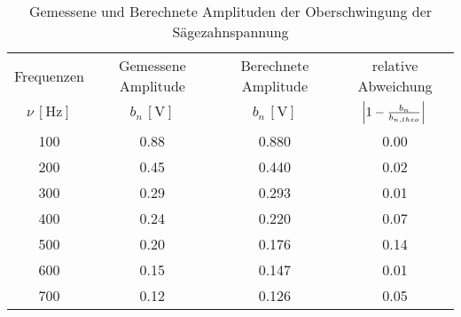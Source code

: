 \begin{table}[!h]
	\centering
	\begin{tabular}{|c|c|c|c|}
		\hline
		Frequenzen & Gemessene Amplitude & Berechnete Amplitude & relative Abweichung\\
		$\nu\,[\si{\hertz}]$ & $b_{n}\,[\si{\volt}]$ & $b_{n}\,[\si{\volt}]$ & $\envert{1 - \tfrac{b_{n}}{b_{n,theo}}}$\\\hline\hline
		\num{100}  & \num{0.88}  & \num{0.880}  & \num{0.00} \\
		\num{200}  & \num{0.45}  & \num{0.440}  & \num{0.02} \\
		\num{300}  & \num{0.29}  & \num{0.293}  & \num{0.01} \\
		\num{400}  & \num{0.24}  & \num{0.220}  & \num{0.07} \\
		\num{500}  & \num{0.20}  & \num{0.176}  & \num{0.14} \\
		\num{600}  & \num{0.15}  & \num{0.147}  & \num{0.01} \\
		\num{700}  & \num{0.12}  & \num{0.126}  & \num{0.05} \\
		\hline
	\end{tabular}
	\caption{Gemessene und Berechnete Amplituden der Oberschwingung der Sägezahnspannung \label{tab:Analyse3}}
\end{table}